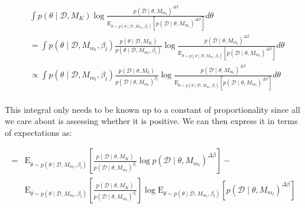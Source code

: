 \documentclass[1p]{article}
\begin{document}
\begin{equation}
\begin{split}
&\int p \left (\theta \mid \mathcal{D}, M_K \right )\log \frac{p \left (\mathcal{D} \mid \theta, M_{m_l} \right )^{\Delta \beta}}{\text{E}_{\theta \sim p \left (\theta \mid \mathcal{D}, M_{m_l}, \beta_l \right )} \left [ p \left (\mathcal{D} \mid \theta, M_{m_l} \right )^{\Delta \beta} \right ]} d\theta\\
&= \int p \left (\theta \mid \mathcal{D}, M_{m_l}, \beta_l \right ) \frac{p \left (\theta \mid \mathcal{D}, M_K \right )}{p \left (\theta \mid \mathcal{D}, M_{m_l}, \beta_l \right )}\log \frac{p \left (\mathcal{D} \mid \theta, M_{m_l} \right )^{\Delta \beta}}{\text{E}_{\theta \sim p \left (\theta \mid \mathcal{D}, M_{m_l}, \beta_l \right )} \left [ p \left (\mathcal{D} \mid \theta, M_{m_l} \right )^{\Delta \beta} \right ]} d\theta\\
&\propto \int p \left (\theta \mid \mathcal{D}, M_{m_l}, \beta_l \right ) \frac{p \left (\mathcal{D} \mid \theta, M_k \right )}{p \left (\mathcal{D} \mid \theta, M_{m_l} \right )^{\beta_l}}\log \frac{p \left (\mathcal{D} \mid \theta, M_{m_l} \right )^{\Delta \beta}}{\text{E}_{\theta \sim p \left (\theta \mid \mathcal{D}, M_{m_l}, \beta_l \right )} \left [ p \left (\mathcal{D} \mid \theta, M_{m_l} \right )^{\Delta \beta} \right ]} d\theta\\
\end{split}
\end{equation}

\noindent This integral only needs to be known up to a constant of proportionality since all we care about is assessing whether it is positive. We can then express it in terms of expectations as:

\begin{equation}
\begin{split}
=&\text{E}_{\theta \sim p \left (\theta \mid \mathcal{D}, M_{m_l}, \beta_l \right )} \left [ \frac{p \left (\mathcal{D} \mid \theta, M_K \right )}{p \left (\mathcal{D} \mid \theta, M_{m_l} \right )^{\beta_l}} \log p \left (\mathcal{D} \mid \theta, M_{m_l} \right )^{\Delta \beta} \right ] -\\
&\text{E}_{\theta \sim p \left (\theta \mid \mathcal{D}, M_{m_l}, \beta_l \right )} \left [ \frac{p \left (\mathcal{D} \mid \theta, M_K \right )}{p \left (\mathcal{D} \mid \theta, M_{m_l}\right )^{\beta_l}} \right ] \log \text{E}_{\theta \sim p \left (\theta \mid \mathcal{D}, M_{m_l}, \beta_l \right )} \left [ p \left (\mathcal{D} \mid \theta, M_{m_l} \right )^{\Delta \beta} \right ]
\end{split}
\end{equation}
\end{document}
